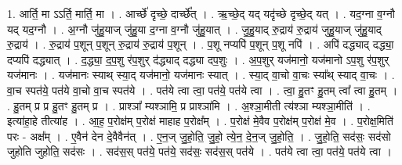 \documentclass[17pt]{extarticle}
\begin{document}
1. आर्ति॒ मा ऽऽर्ति॒ मार्ति॒ मा । . आर्च्छे॑ दृच्छे॒ दार्च्छे᳚त् । . ऋ॒च्छे॒द् यद् यदृ॑च्छे दृच्छे॒द् यत् । . यद॒ग्ना व॒ग्नौ यद् यद॒ग्नौ । . अ॒ग्नौ जु॑हु॒याज् जु॑हु॒या द॒ग्ना व॒ग्नौ जु॑हु॒यात् । . जु॒हु॒याद् रु॒द्राय॑ रु॒द्राय॑ जुहु॒याज् जु॑हु॒याद् रु॒द्राय॑ । . रु॒द्राय॑ प॒शून् प॒शून् रु॒द्राय॑ रु॒द्राय॑ प॒शून् । . प॒शू नप्यपि॑ प॒शून् प॒शू नपि॑ । . अपि॑ दद्ध्याद् दद्ध्या॒ दप्यपि॑ दद्ध्यात् । . द॒द्ध्या॒ द॒प॒शु र॑प॒शुर् द॑द्ध्याद् दद्ध्या दप॒शुः । . अ॒प॒शुर् यज॑मानो॒ यज॑मानो ऽप॒शु र॑प॒शुर् यज॑मानः । . यज॑मानः स्याथ् स्या॒द् यज॑मानो॒ यज॑मानः स्यात् । . स्या॒द् वा॒चो वा॒चः स्या᳚थ् स्याद् वा॒चः । . वा॒च स्पत॑ये॒ पत॑ये वा॒चो वा॒च स्पत॑ये । . पत॑ये त्वा त्वा॒ पत॑ये॒ पत॑ये त्वा । . त्वा॒ हु॒तꣳ हु॒तम् त्वा᳚ त्वा हु॒तम् । . हु॒तम् प्र प्र हु॒तꣳ हु॒तम् प्र । . प्राश्ञा᳚ म्यश्ञामि॒ प्र प्राश्ञा॑मि । . अ॒श्ञा॒मीती त्य॑श्ञा म्यश्ञा॒मीति॑ । . इत्या॑हा॒हे तीत्या॑ह । . आ॒ह॒ प॒रोक्ष॑म् प॒रोक्ष॑ माहाह प॒रोक्ष᳚म् । . प॒रोक्ष॑ मे॒वैव प॒रोक्ष॑म् प॒रोक्ष॑ मे॒व । . प॒रोक्ष॒मिति॑ परः - अक्ष᳚म् । . ए॒वैन॑ देन दे॒वैवैन॑त् । . ए॒न॒ज् जु॒हो॒ति॒ जु॒हो॒ त्ये॒न॒ दे॒न॒ज् जु॒हो॒ति॒ । . जु॒हो॒ति॒ सद॑सः॒ सद॑सो जुहोति जुहोति॒ सद॑सः । . सद॑स॒स् पत॑ये॒ पत॑ये॒ सद॑सः॒ सद॑स॒स् पत॑ये । . पत॑ये त्वा त्वा॒ पत॑ये॒ पत॑ये त्वा । \newline
\end{document}
